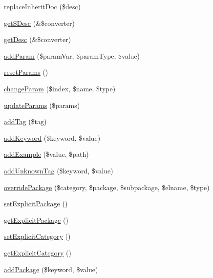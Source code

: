 \begin{DoxyCompactItemize}
\hyperlink{classparser_doc_block_a517803859430dc475e50866420aed322}{replace\-Inherit\-Doc} (\$desc)
\item 
\hyperlink{classparser_doc_block_a9dcab14f576f50b85b1f3658b75c7129}{get\-S\-Desc} (\&\$converter)
\item 
\hyperlink{classparser_doc_block_a8e3f080d48d0c25b6bbb0b7b9a618623}{get\-Desc} (\&\$converter)
\item 
\hyperlink{classparser_doc_block_a90d5dcf7fc3c2202438a4b96e8f4f9a3}{add\-Param} (\$param\-Var, \$param\-Type, \$value)
\item 
\hyperlink{classparser_doc_block_adfb50d2550e9aaa567622624ddb5c6ab}{reset\-Params} ()
\item 
\hyperlink{classparser_doc_block_ae46ea36f02c9fe3e195f3f5c97cc9b23}{change\-Param} (\$index, \$name, \$type)
\item 
\hyperlink{classparser_doc_block_a819ec8727c5abeef4c78750873880f32}{update\-Params} (\$params)
\item 
\hyperlink{classparser_doc_block_a5b548a3558ba411599eaa8328ebd8f02}{add\-Tag} (\$tag)
\item 
\hyperlink{classparser_doc_block_a92b5e1743cfd89cf54060c1857d5f3a6}{add\-Keyword} (\$keyword, \$value)
\item 
\hyperlink{classparser_doc_block_a397f6eeb885321a6d3d3fb08b25aa88c}{add\-Example} (\$value, \$path)
\item 
\hyperlink{classparser_doc_block_aa30e19ce6dc0e670a732953b7042ca7c}{add\-Unknown\-Tag} (\$keyword, \$value)
\item 
\hyperlink{classparser_doc_block_a9c8edfd93c422b1ffa0e7629c37b9190}{override\-Package} (\$category, \$package, \$subpackage, \$elname, \$type)
\item 
\hyperlink{classparser_doc_block_a20a0597df891f512b70971e25f59397c}{set\-Explicit\-Package} ()
\item 
\hyperlink{classparser_doc_block_ab94244970e44df56f14caf39812aab0a}{get\-Explicit\-Package} ()
\item 
\hyperlink{classparser_doc_block_a16e665e95236e59aa147cd6102e2edbd}{set\-Explicit\-Category} ()
\item 
\hyperlink{classparser_doc_block_af19a37f5deb54e4b90f11a07a67c06b0}{get\-Explicit\-Category} ()
\item 
\hyperlink{classparser_doc_block_a03cfd69891f95963fed8f1c2a9866762}{add\-Package} (\$keyword, \$value)
\end{DoxyCompactItemize}
